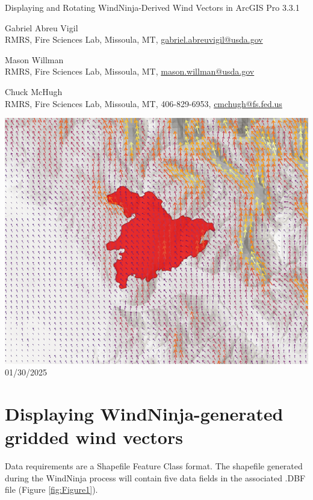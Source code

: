 \documentclass[12pt]{article}
\begin{document}
\begin{titlepage}
    \centering
    {\Huge
        Displaying and Rotating WindNinja-Derived Wind Vectors in ArcGIS Pro 3.3.1
    }
    \vfill
    {\Large
    Gabriel Abreu Vigil\\ RMRS, Fire Sciences Lab, Missoula, MT, \href{mailto:gabriel.abreuvigil@usda.gov}{gabriel.abreuvigil@usda.gov}

    Mason Willman\\ RMRS, Fire Sciences Lab, Missoula, MT, \href{mailto:mason.willman@usda.gov}{mason.willman@usda.gov}

    Chuck McHugh\\ RMRS, Fire Sciences Lab, Missoula, MT, 406-829-6953, \href{mailto:cmchugh@fs.fed.us}{cmchugh@fs.fed.us}
    }
    \vfill
    \includegraphics[scale=0.7]							{arc_00.png}
    \vfill
  	{\Large
	  01/30/2025 %
  	}
    \vfill
\end{titlepage}

\section*{Displaying WindNinja-generated gridded wind vectors}
Data requirements are a Shapefile Feature Class format. The shapefile generated during the WindNinja process will
contain five data fields in the associated .DBF file (Figure \ref{fig:Figure1}).
\end{document}
